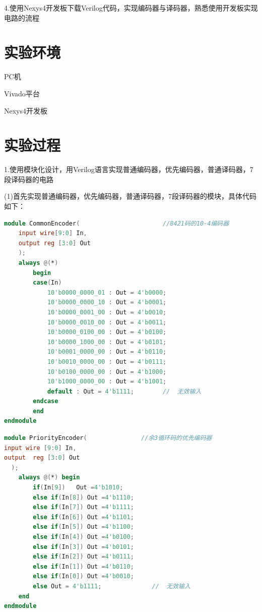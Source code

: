 \documentclass[UTF8,fontset=fandol]{ctexart}
\begin{document}
4.使用Nexys4开发板下载Verilog代码，实现编码器与译码器，熟悉使用开发板实现电路的流程

\section*{实验环境}

PC机

Vivado平台

Nexys4开发板
\section*{实验过程}

1.使用模块化设计，用Verilog语言实现普通编码器，优先编码器，普通译码器，7段译码器的电路

(1)首先实现普通编码器，优先编码器，普通译码器，7段译码器的模块，具体代码如下：

\begin{lstlisting}[language=Verilog,keywordstyle=\color{red!70}]
module CommonEncoder(                       //8421码的10-4编码器
    input wire[9:0] In,
    output reg [3:0] Out
    );
    always @(*)
        begin
        case(In)
            10'b0000_0000_01 : Out = 4'b0000;
            10'b0000_0000_10 : Out = 4'b0001;
            10'b0000_0001_00 : Out = 4'b0010;
            10'b0000_0010_00 : Out = 4'b0011;
            10'b0000_0100_00 : Out = 4'b0100;
            10'b0000_1000_00 : Out = 4'b0101;
            10'b0001_0000_00 : Out = 4'b0110;
            10'b0010_0000_00 : Out = 4'b0111;
            10'b0100_0000_00 : Out = 4'b1000;
            10'b1000_0000_00 : Out = 4'b1001;
            default : Out = 4'b1111;        //  无效输入
        endcase
        end   
endmodule
\end{lstlisting}
\begin{lstlisting}[language=Verilog,keywordstyle=\color{red!70}]
    module PriorityEncoder(               //余3循环码的优先编码器
input wire [9:0] In,
output  reg [3:0] Out 
  );
    always @(*) begin
        if(In[9])   Out =4'b1010;
        else if(In[8]) Out =4'b1110;
        else if(In[7]) Out =4'b1111;
        else if(In[6]) Out =4'b1101;
        else if(In[5]) Out =4'b1100;
        else if(In[4]) Out =4'b0100;
        else if(In[3]) Out =4'b0101;
        else if(In[2]) Out =4'b0111;
        else if(In[1]) Out =4'b0110;
        else if(In[0]) Out =4'b0010; 
        else Out = 4'b1111;              //  无效输入
    end
endmodule
\end{lstlisting}
\end{document}
